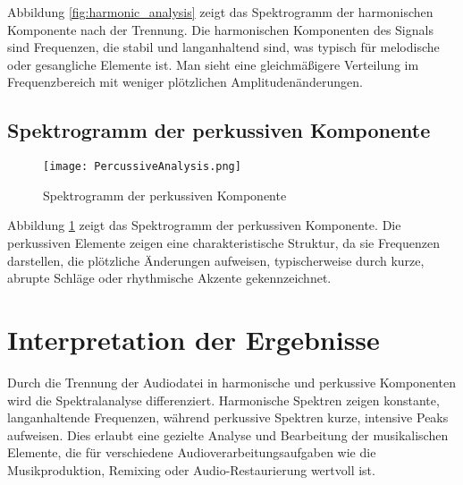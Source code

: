 Abbildung \ref{fig:harmonic_analysis} zeigt das Spektrogramm der harmonischen Komponente nach der Trennung. Die harmonischen Komponenten des Signals sind Frequenzen, die stabil und langanhaltend sind, was typisch für melodische oder gesangliche Elemente ist. Man sieht eine gleichmäßigere Verteilung im Frequenzbereich mit weniger plötzlichen Amplitudenänderungen.

\subsection{Spektrogramm der perkussiven Komponente}

\begin{figure}
    \centering
    \texttt{[image: PercussiveAnalysis.png]}
    \caption{Spektrogramm der perkussiven Komponente}
    \label{fig:percussive_analysis}
\end{figure}

Abbildung \ref{fig:percussive_analysis} zeigt das Spektrogramm der perkussiven Komponente. Die perkussiven Elemente zeigen eine charakteristische Struktur, da sie Frequenzen darstellen, die plötzliche Änderungen aufweisen, typischerweise durch kurze, abrupte Schläge oder rhythmische Akzente gekennzeichnet.

\section{Interpretation der Ergebnisse}

Durch die Trennung der Audiodatei in harmonische und perkussive Komponenten wird die Spektralanalyse differenziert. Harmonische Spektren zeigen konstante, langanhaltende Frequenzen, während perkussive Spektren kurze, intensive Peaks aufweisen. Dies erlaubt eine gezielte Analyse und Bearbeitung der musikalischen Elemente, die für verschiedene Audioverarbeitungsaufgaben wie die Musikproduktion, Remixing oder Audio-Restaurierung wertvoll ist.

